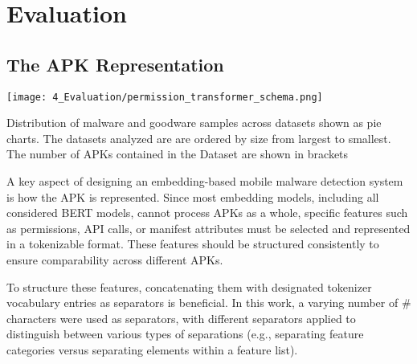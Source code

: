 \chapter{Evaluation}

\label{Evaluation} %


\section{The APK Representation}

\begin{marginfigure}[3\baselineskip] %
    \center
    \texttt{[image: 4\_Evaluation/permission\_transformer\_schema.png]}
    \caption{\label{fig:permission_transformer_schema}
    Distribution of malware and goodware samples across datasets shown as pie charts.
    The datasets analyzed are are ordered by size from largest to smallest.
    The number of APKs contained in the Dataset are shown in brackets}
\end{marginfigure}

A key aspect of designing an embedding-based mobile malware detection system is 
how the APK is represented. Since most embedding models, including all considered BERT models, 
cannot process APKs as a whole, specific features such as permissions, API calls, 
or manifest attributes must be selected and represented in a tokenizable format. 
These features should be structured consistently to ensure comparability across different APKs.

To structure these features, concatenating them with designated tokenizer vocabulary entries 
as separators is beneficial. 
In this work, a varying number of \# characters were used as separators, 
with different separators applied to distinguish between various types of separations 
(e.g., separating feature categories versus separating elements within a feature list).

